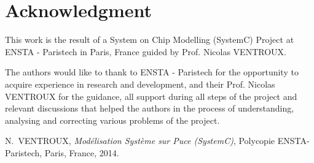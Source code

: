 \documentclass[journal]{IEEEtran}
\begin{document}
\section*{Acknowledgment}

This work is the result of a System on Chip Modelling (SystemC) Project at ENSTA - Paristech in Paris, France guided by Prof. Nicolas VENTROUX.

The authors would like to thank to ENSTA - Paristech for the opportunity to acquire experience in research and development, and their Prof. Nicolas VENTROUX for the guidance,  all support during all steps of the project and relevant discussions that helped the authors in the process of understanding, analysing and correcting various problems of the project.


\ifCLASSOPTIONcaptionsoff
  \newpage
\fi





%
%
%
\begin{thebibliography}{1}

  
N.~VENTROUX, \emph{Mod\'{e}lisation Syst\`{e}me sur Puce (SystemC)}, Polycopie ENSTA-Paristech,
\relax Paris, France, 2014.

\end{thebibliography}
\end{document}

